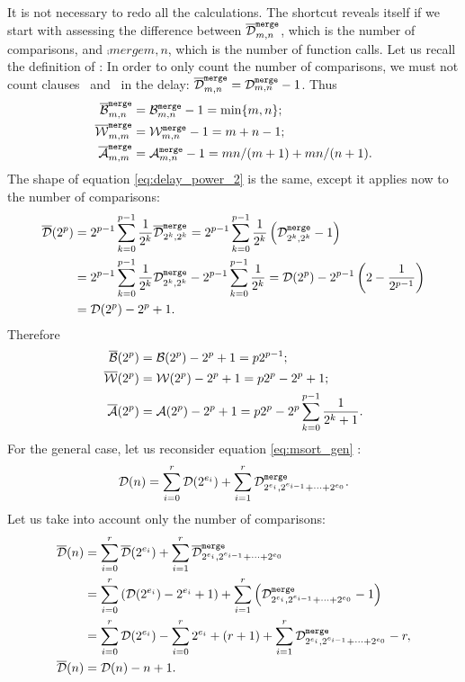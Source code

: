 It is not necessary to redo all the calculations. The shortcut reveals
itself if we start with assessing the difference between
\(\cdelay{merge}{m,n}\), which is the number of comparisons, and
\(\comp{merge}{m,n}\), which is the number of function calls. Let us
recall the \Erlang definition of :
 In order to only count the number of comparisons,
we must not count clauses \clause{\alpha}~and~\clause{\beta} in the
delay: \(\cdelay{merge}{m,n} = \comp{merge}{m,n} - 1\). Thus
\begin{align*}
\cbest{merge}{m,n}  &= \best{merge}{m,n} - 1 = \min\{m,n\};\\
\cworst{merge}{m,m} &= \worst{merge}{m,n} - 1 = m + n - 1;\\
\cave{merge}{m,m}   &= \ave{merge}{m,n} - 1 = mn/(m+1) + mn/(n+1).
\end{align*}
The shape of equation \eqref{eq:delay_power_2}
 is the same, except it applies now to the
number of comparisons:
\begin{align*}
\Dcomp(2^p) &= 2^{p-1}\sum_{k=0}^{p-1}{\frac{1}{2^k}\cdelay{merge}{2^k,2^k}}
 = 2^{p-1}\sum_{k=0}^{p-1}{\frac{1}{2^k}\left(\comp{merge}{2^k,2^k}-1\right)}\\
 &= 2^{p-1}\sum_{k=0}^{p-1}{\frac{1}{2^k}\comp{merge}{2^k,2^k}}
   - 2^{p-1}\sum_{k=0}^{p-1}{\frac{1}{2^k}}
 = \Dideal(2^p) - 2^{p-1}\left(2 - \frac{1}{2^{p-1}}\right)\\
 &= \Dideal(2^p) - 2^p + 1.
\end{align*}
Therefore
\begin{align*}
\Bcomp(2^p) &= \Bideal(2^p) - 2^p + 1 = p2^{p-1};\\
\Wcomp(2^p) &= \Wideal(2^p) - 2^p + 1 = p2^p - 2^p + 1;\\
\Acomp(2^p) &= \Aideal(2^p) - 2^p + 1
             = p2^p - 2^p\sum_{k=0}^{p-1}\frac{1}{2^k+1}.
\end{align*}
For the general case, let us reconsider equation \eqref{eq:msort_gen}
:
\begin{equation*}
\Dideal(n)
  = \sum_{i=0}^{r}{\Dideal(2^{e_i})}
    +
    \sum_{i=1}^{r}{\comp{merge}{2^{e_i},2^{e_{i-1}}+\dots+2^{e_0}}}.
\end{equation*}
Let us take into account only the number of comparisons:
\begin{align*}
\Dcomp(n)
  &= \sum_{i=0}^{r}{\Dcomp(2^{e_i})}
    +
    \sum_{i=1}^{r}{\cdelay{merge}{2^{e_i},2^{e_{i-1}}+\dots+2^{e_0}}}\\
  &= \sum_{i=0}^{r}{(\Dideal(2^{e_i}) - 2^{e_i} + 1)}
    +
    \sum_{i=1}^{r}{\left(\comp{merge}{2^{e_i},2^{e_{i-1}}+\dots+2^{e_0}}
      - 1\right)}\\
  &= \sum_{i=0}^{r}{\Dideal(2^{e_i})} - \sum_{i=0}^{r}{2^{e_i}}
     + (r+1)
     +  \sum_{i=1}^{r}{\comp{merge}{2^{e_i},2^{e_{i-1}}+\dots+2^{e_0}}}
     - r,\\
\Dcomp(n)
  &= \Dideal(n) - n + 1.
\end{align*}
